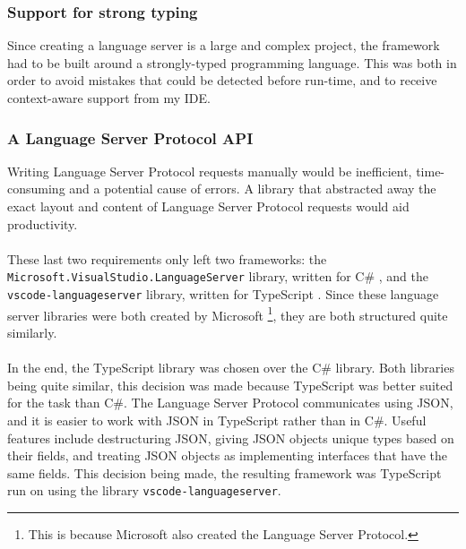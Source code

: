 \documentclass[../main.tex]{subfiles}
\begin{document}
\subsubsection{Support for strong typing}
Since creating a language server is a large and complex project, the framework had to be built around a strongly-typed programming language. This was both in order to avoid mistakes that could be detected before run-time, and to receive context-aware support from my IDE.

\subsubsection{A Language Server Protocol API}
Writing Language Server Protocol requests manually would be inefficient, time-consuming and a potential cause of errors. A library that abstracted away the exact layout and content of Language Server Protocol requests would aid productivity.
\\ 
\\
These last two requirements only left two frameworks: the \\ 
\texttt{Microsoft.VisualStudio.LanguageServer} library, written for C\# \cite{visual_studio_language_server}, and the \\ 
\texttt{vscode-languageserver} library, written for TypeScript \cite{vsc_langserver_docs}. Since these language server libraries were both created by Microsoft \footnote{This is because Microsoft also created the Language Server Protocol.}, they are both structured quite similarly. 
\\
\\
In the end, the TypeScript library was chosen over the C\# library. Both libraries being quite similar, this decision was made because TypeScript was better suited for the task than C\#. The Language Server Protocol communicates using JSON, and it is easier to work with JSON in TypeScript rather than in C\#. Useful features include destructuring JSON, giving JSON objects unique types based on their fields, and treating JSON objects as implementing interfaces that have the same fields. This decision being made, the resulting framework was TypeScript run on  using the library \texttt{vscode-languageserver}. 
\end{document}
